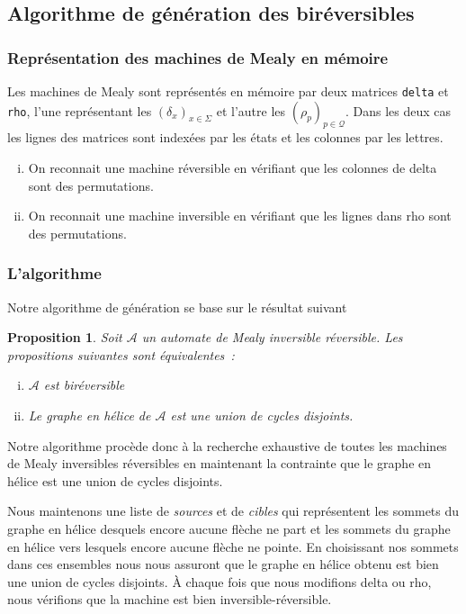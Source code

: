 \documentclass[11pt,a4paper]{article}
\newtheorem{prop}{Proposition}
\begin{document}
\subsection{Algorithme de génération des biréversibles\label{sec:gen}}

\subsubsection*{Représentation des machines de Mealy en mémoire}
Les machines de Mealy sont représentés en mémoire par deux matrices \lstinline$delta$ et \lstinline{rho}, l'une représentant les $(\delta_x)_{x\in\Sigma}$ et l'autre les $(\rho_p)_{p\in\mathcal{Q}}$. Dans les deux cas les lignes des matrices sont indexées par les états et les colonnes par les lettres.

\begin{enumerate}[(i)]
\item On reconnait une machine réversible en vérifiant que les colonnes de \textrm{delta}  sont des permutations.
\item On reconnait une machine inversible en vérifiant que les lignes dans \textrm{rho} sont des permutations.
\end{enumerate}

\subsubsection*{L'algorithme}
Notre algorithme de génération se base sur le résultat suivant

\begin{prop}{\cite{DBLP:journals/corr/abs-1105-4725}}
  \label{thm:ir-helix}
  Soit $\mathcal{A}$ un automate de Mealy inversible réversible. Les propositions suivantes sont équivalentes~:

  \begin{enumerate}[(i)]
  \item $\mathcal{A}$ est biréversible
  \item Le graphe en hélice de $\mathcal{A}$ est une union de cycles disjoints.
  \end{enumerate}
\end{prop}

Notre algorithme procède donc à la recherche exhaustive de toutes les machines de Mealy inversibles réversibles en maintenant la contrainte que le graphe en hélice est une union de cycles disjoints.

Nous maintenons une liste de \textit{sources} et de \textit{cibles} qui représentent les sommets du graphe en hélice desquels encore aucune flèche ne part et les sommets du graphe en hélice vers lesquels encore aucune flèche ne pointe. En choisissant nos sommets dans ces ensembles nous nous assuront que le graphe en hélice obtenu est bien une union de cycles disjoints. À chaque fois que nous modifions \textrm{delta} ou \textrm{rho}, nous vérifions que la machine est bien inversible-réversible.
\end{document}
